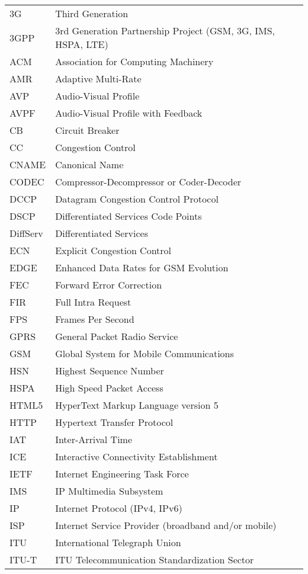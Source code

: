 \begin{longtable}{ll}
3G  	& Third Generation \\
3GPP 	& 3rd Generation Partnership Project (GSM, 3G, IMS, HSPA, LTE)\\
ACM 	& Association for Computing Machinery \\
AMR 	& Adaptive Multi-Rate \\
AVP 	& Audio-Visual Profile \\
AVPF	& Audio-Visual Profile with Feedback \\
CB  	& Circuit Breaker \\
CC  	& Congestion Control \\
CNAME	& Canonical Name \\
CODEC	& Compressor-Decompressor or Coder-Decoder \\
DCCP 	& Datagram Congestion Control Protocol \\
DSCP 	& Differentiated Services Code Points \\
DiffServ	& Differentiated Services \\
ECN  	& Explicit Congestion Control \\
EDGE 	& Enhanced Data Rates for GSM Evolution \\
FEC  	& Forward Error Correction \\
FIR 	& Full Intra Request \\
FPS 	& Frames Per Second \\
GPRS 	& General Packet Radio Service \\
GSM 	& Global System for Mobile Communications \\
HSN 	& Highest Sequence Number \\
HSPA 	& High Speed Packet Access \\
HTML5	& HyperText Markup Language version 5\\
HTTP 	& Hypertext Transfer Protocol \\
IAT  	& Inter-Arrival Time \\
ICE  	& Interactive Connectivity Establishment \\
IETF	& Internet Engineering Task Force \\
IMS 	& IP Multimedia Subsystem \\
IP  	& Internet Protocol (IPv4, IPv6)\\
ISP 	& Internet Service Provider (broadband and/or mobile) \\
ITU 	& International Telegraph Union \\
ITU-T 	& ITU Telecommunication Standardization Sector \\

\end{longtable}
